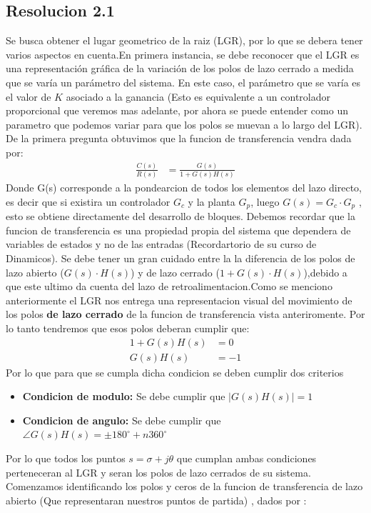 \documentclass[
  11pt,
  letterpaper,
   addpoints,
   answers
  ]{exam}
\begin{document}
\begin{questions}
\begin{solution}
\subsection*{Resolucion 2.1}
    Se busca obtener el lugar geometrico de la raiz (LGR), por lo que se debera tener varios aspectos en cuenta.En primera instancia, se debe reconocer que el LGR es una representación gráfica de la variación de los polos de lazo cerrado a medida que se varía un parámetro del sistema. En este caso, el parámetro que se varía es el valor de $K$ asociado a la ganancia (Esto es equivalente a un controlador proporcional que veremos mas adelante, por ahora se puede entender como un parametro que podemos variar para que los polos se muevan a lo largo del LGR). De la primera pregunta obtuvimos que la funcion de transferencia vendra dada por:
    \begin{align}
        \frac{C(s)}{R(s) }&= \frac{G(s)}{1+G(s)H(s)}
    \end{align} 
    Donde G(s) corresponde a la pondearcion de todos los elementos del lazo directo, es decir que si existira un controlador $G_{c}$ y la planta $G_{p}$, luego $G(s) = G_{c} \cdot G_{p}$ , esto se obtiene directamente del desarrollo de bloques. Debemos recordar que la funcion de transferencia es una propiedad propia del sistema que dependera de variables de estados y no de las entradas (Recordartorio de su curso de Dinamicos). Se debe tener un gran cuidado entre la la diferencia de los polos de lazo abierto ($G(s) \cdot H(s)$) y de lazo cerrado ($1+G(s) \cdot H(s)$),debido a que este ultimo da cuenta del lazo de retroalimentacion.Como se menciono anteriormente el LGR nos entrega una representacion visual del movimiento de los polos \textbf{de lazo cerrado} de la funcion de transferencia vista anteriromente. Por lo tanto tendremos que esos polos deberan cumplir que:
    \begin{align}
        1+G(s)H(s) &= 0\\
        G(s)H(s) &= -1
    \end{align}
    Por lo que para que se cumpla dicha condicion se deben cumplir dos criterios
    \begin{itemize}
        \item \textbf{Condicion de modulo:} Se debe cumplir que $|G(s)H(s)| = 1$ 
        \item \textbf{Condicion de angulo:} Se debe cumplir que $\angle G(s)H(s) = \pm 180^{\circ} + n360^{\circ}$ 
    \end{itemize}
Por lo que todos los puntos $s = \sigma + j\theta$ que cumplan ambas condiciones perteneceran al LGR y seran los polos de lazo cerrados de su sistema. Comenzamos identificando los polos y ceros de la funcion de transferencia de lazo abierto (Que representaran nuestros puntos de partida) , dados por :

\end{solution}
\end{questions}
\end{document}
